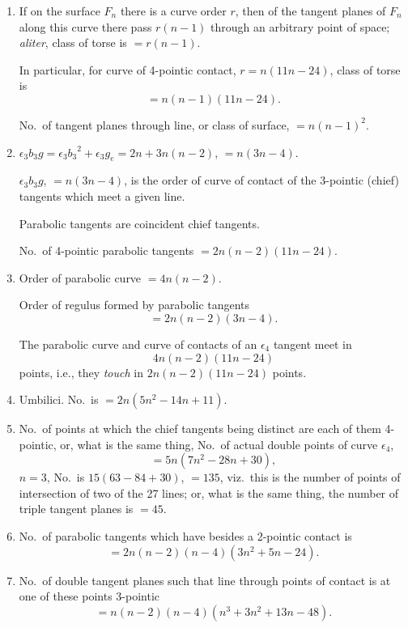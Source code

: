 \documentclass[11pt,a4paper]{book}
\begin{document}
\begin{enumerate}[label=\arabic*., start=25]
\item If on the surface $F_n$ there is a curve order $r$, then of the tangent planes of $F_n$ along this curve there pass $r(n-1)$ through an arbitrary point of space; \textit{aliter}, class of torse is $= r(n-1)$.

In particular, for curve of 4-pointic contact, $r = n(11n - 24)$, class of torse is
\[= n(n-1)(11n - 24).\]

No.\ of tangent planes through line, or class of surface, $= n(n-1)^2$.

\item $\epsilon_3 b_3 g = \epsilon_3{b_3}^2 + \epsilon_3 g_e = 2n + 3n(n-2)$, $= n(3n - 4)$.

$\epsilon_3 b_3 g$, $= n(3n - 4)$, is the order of curve of contact of the 3-pointic (chief) tangents which meet a given line.

Parabolic tangents are coincident chief tangents.

No.\ of 4-pointic parabolic tangents $= 2n(n-2)(11n - 24)$.

\item Order of parabolic curve $= 4n(n-2)$.

Order of regulus formed by parabolic tangents
\[= 2n(n-2)(3n - 4).\]

The parabolic curve and curve of contacts of an $\epsilon_4$ tangent meet in
\[4n(n-2)(11n - 24)\]
points, i.e., they \textit{touch} in $2n(n-2)(11n - 24)$ points.

\item Umbilici. No.\ is $= 2n(5n^2 - 14n + 11)$.

\item No.\ of points at which the chief tangents being distinct are each of them 4-pointic, or, what is the same thing, No.\ of actual double points of curve $\epsilon_4$,
\[= 5n(7n^2 - 28n + 30),\]
$n = 3$, No.\ is $15(63 - 84 + 30)$, $= 135$, viz.\ this is the number of points of intersection of two of the 27 lines; or, what is the same thing, the number of triple tangent planes is $= 45$.

\item No.\ of parabolic tangents which have besides a 2-pointic contact is
\[= 2n(n-2)(n-4)(3n^2 + 5n - 24).\]

\item No.\ of double tangent planes such that line through points of contact is at one of these points 3-pointic
\[= n(n-2)(n-4)(n^3 + 3n^2 + 13n - 48).\]


\end{enumerate}
\end{document}
